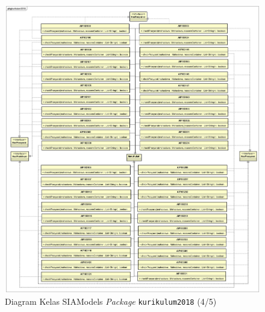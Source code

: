 \begin{figure}[H]
\centering
\includegraphics[scale=0.19]{Gambar/class-diagram-siamodels-mk-kurikulum-2018-4}
\caption{Diagram Kelas SIAModels \textit{Package} \texttt{kurikulum2018} (4/5)}
\label{fig:siamodels_class_2018_kurikulum_4}
\end{figure}

